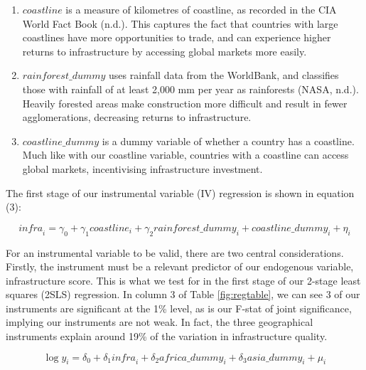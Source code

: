 \documentclass[12pt,a4paper]{article}
\begin{document}
\begin{enumerate}[label=(\roman*)]
  \item $\mathit{coastline}$ is a measure of kilometres of coastline, as recorded in the CIA World Fact Book (n.d.). This captures the fact that countries with large coastlines have more opportunities to trade, and can experience higher returns to infrastructure by accessing global markets more easily.
  \item $\mathit{rainforest\_dummy}$ uses rainfall data from the WorldBank, and classifies those with rainfall of at least 2,000 mm per year as rainforests (NASA, n.d.). Heavily forested areas make construction more difficult and result in fewer agglomerations, decreasing returns to infrastructure.
  \item $\mathit{coastline\_dummy}$ is a dummy variable of whether a country has a coastline. Much like with our coastline variable, countries with a coastline can access global markets, incentivising infrastructure investment.
\end{enumerate}

The first stage of our instrumental variable (IV) regression is shown in equation (3):

\begin{equation}
  \mathit{infra}_i = \gamma_0 + \gamma_1 \mathit{coastline}_i + \gamma_2 \mathit{rainforest\_dummy}_i + \mathit{coastline\_dummy}_i + \eta_i
\end{equation}

For an instrumental variable to be valid, there are two central considerations. Firstly, the instrument must be a relevant predictor of our endogenous variable, infrastructure score. This is what we test for in the first stage of our 2-stage least squares (2SLS) regression. In column 3 of Table \ref{fig:regtable}, we can see 3 of our instruments are significant at the 1\% level, as is our F-stat of joint significance, implying our instruments are not weak. In fact, the three geographical instruments explain around 19\% of the variation in infrastructure quality.

\begin{equation}
  \log y_i = \delta_0 + \delta_1 \mathit{infra}_i + \delta_2 \mathit{africa\_dummy}_i + \delta_3 \mathit{asia\_dummy}_i + \mu_i
\end{equation}
\end{document}
